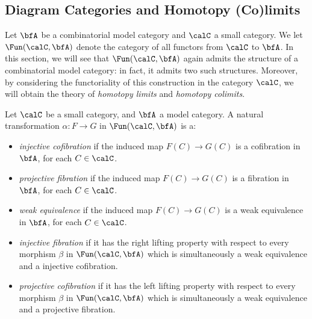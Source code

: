 \begin{Model Categories}
\begin{Didn't Read}
\subsection{Diagram Categories and Homotopy (Co)limits}\label{qlim7}

Let $\bfA$ be a combinatorial model category and $\calC$ a small category.
We let $\Fun(\calC, \bfA)$ denote the category of all functors from $\calC$ to $\bfA$.
In this section, we will see that $\Fun(\calC, \bfA)$ again admits the structure of a combinatorial model category: in fact, it admits two such structures. Moreover,
by considering the functoriality of this construction in the category $\calC$, we will obtain
the theory of {\it homotopy limits} and {\it homotopy colimits}.

\begin{definition}\label{injproj}\label{cooper}
Let $\calC$ be a small category, and $\bfA$ a model category.
A natural transformation $\alpha: F \rightarrow G$ in $\Fun(\calC, \bfA)$ is a:

\begin{itemize}
\item {\it injective cofibration} if the induced map $F(C) \rightarrow
G(C)$ is a cofibration in $\bfA$, for each $C \in \calC$.

\item {\it projective fibration} if the induced map $F(C) \rightarrow
G(C)$ is a fibration in $\bfA$, for each $C \in \calC$.

\item {\it weak equivalence} if the induced map $F(C) \rightarrow
G(C)$ is a weak equivalence in $\bfA$, for each $C \in \calC$.

\item {\it injective fibration} if it has the right lifting property
with respect to every morphism $\beta$ in $\Fun(\calC, \bfA)$ which is
simultaneously a weak equivalence and a injective cofibration.

\item {\it projective cofibration} if it has the left lifting property
with respect to every morphism $\beta$ in $\Fun(\calC, \bfA)$ which is
simultaneously a weak equivalence and a projective fibration.
\end{itemize}
\end{definition}


\end{Didn't Read}
\end{Model Categories}
